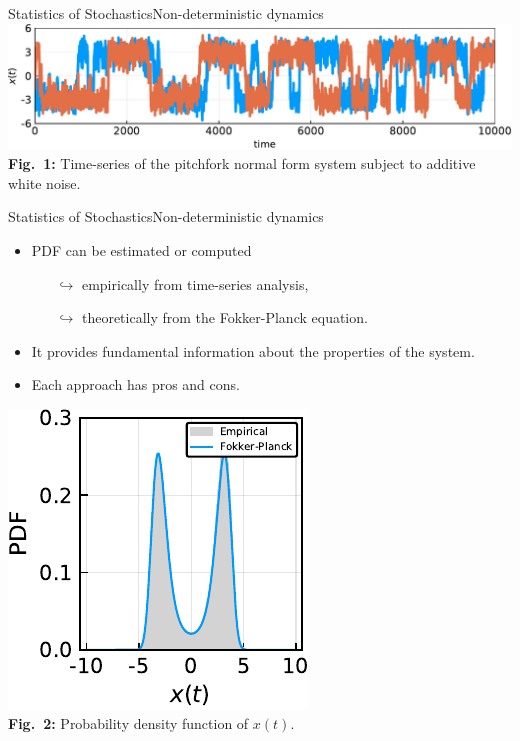 \documentclass[usenames,dvipsnames,svgnames,10pt,aspectratio=169]{beamer}
\begin{document}
\begin{frame}[t, c]{Statistics of Stochastics}{Non-deterministic dynamics}
	\centering
	\includegraphics[width=.9\textwidth]{stochastic_pitchfork} \\
	\textbf{Fig.\ 1:} Time-series of the pitchfork normal form system subject to additive white noise.

	\vspace{1cm}
\end{frame}

\begin{frame}[t, c]{Statistics of Stochastics}{Non-deterministic dynamics}
	\begin{minipage}{.48\textwidth}
		\begin{itemize}
			\item PDF can be estimated or computed
			\begin{itemize}
				\item[$\hookrightarrow$] empirically from time-series analysis,
				\item[$\hookrightarrow$] theoretically from the Fokker-Planck equation.
			\end{itemize}
			\medskip
			\item It provides fundamental information about the properties of the system.
			\medskip
			\item Each approach has pros and cons.
		\end{itemize}
	\end{minipage}%
	\hfill
	\begin{minipage}{.48\textwidth}
		\centering
		\includegraphics[width=.666\columnwidth]{stochastic_pitchfork_pdf} \\
		\textbf{Fig.\ 2:} Probability density function of $x(t)$.
	\end{minipage}

	\vspace{1cm}
\end{frame}
\end{document}

